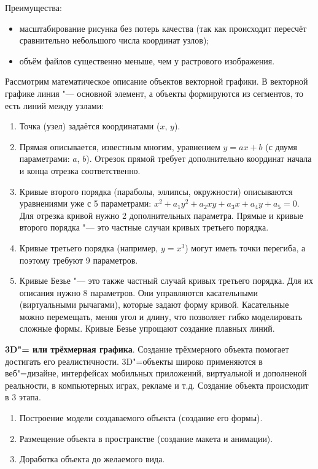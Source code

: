 Преимущества:
\begin{itemize}
    \item масштабирование рисунка без потерь качества (так как происходит пересчёт сравнительно небольшого числа координат узлов);
    \item объём файлов существенно меньше, чем у растрового изображения.
\end{itemize}

Рассмотрим математическое описание объектов векторной графики. В векторной графике линия "--- основной элемент, а объекты формируются из сегментов, то есть линий между узлами\cite{vec_graphics}:
\begin{enumerate}
    \item Точка (узел) задаётся координатами ($x$, $y$).
    \item Прямая описывается, известным многим, уравнением $y = ax + b$ (с двумя параметрами: $a$, $b$). Отрезок прямой требует дополнительно координат начала и конца отрезка соответственно.
    \item Кривые второго порядка (параболы, эллипсы, окружности) описываются уравнениями уже с 5 параметрами: $x^{2} + a_{1}y^{2} + a_{2}xy + a_{3}x + a_{4}y + a_{5} = 0$. Для отрезка кривой нужно 2 дополнительных параметра.
    Прямые и кривые второго порядка "--- это частные случаи кривых третьего порядка.
    \item Кривые третьего порядка (например, $y = x^{3}$) могут иметь точки перегиба, а поэтому требуют 9 параметров.
    \item Кривые Безье "--- это также частный случай кривых третьего порядка. Для их описания нужно 8 параметров. Они управляются касательными (виртуальными рычагами), которые задают форму кривой. Касательные можно перемещать, меняя угол и длину, что позволяет гибко моделировать сложные формы. Кривые Безье упрощают создание плавных линий.
\end{enumerate}

\textbf{3D"= или трёхмерная графика}. Создание трёхмерного объекта помогает достигать его реалистичности. 3D"=объекты широко применяются в веб"=дизайне, интерфейсах мобильных приложений, виртуальной и дополненой реальности, в компьютерных играх, рекламе и т.д. Создание объекта происходит в 3 этапа.
\begin{enumerate}
    \item Построение модели создаваемого объекта (создание его формы).
    \item Размещение объекта в пространстве (создание макета и анимации).
    \item Доработка объекта до желаемого вида.
\end{enumerate}

